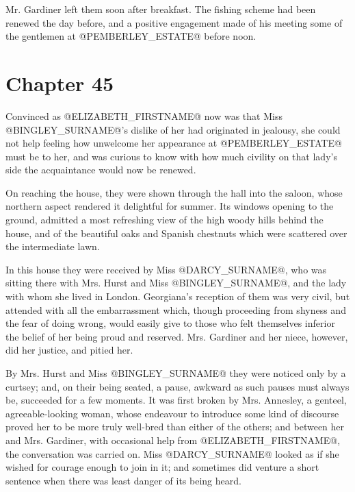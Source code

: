 Mr. Gardiner left them soon after breakfast. The fishing scheme had been
renewed the day before, and a positive engagement made of his meeting
some of the gentlemen at @PEMBERLEY_ESTATE@ before noon.



\chapter*{Chapter 45}


Convinced as @ELIZABETH_FIRSTNAME@ now was that Miss @BINGLEY_SURNAME@'s dislike of her had
originated in jealousy, she could not help feeling how unwelcome her
appearance at @PEMBERLEY_ESTATE@ must be to her, and was curious to know with how
much civility on that lady's side the acquaintance would now be renewed.

On reaching the house, they were shown through the hall into the saloon,
whose northern aspect rendered it delightful for summer. Its windows
opening to the ground, admitted a most refreshing view of the high woody
hills behind the house, and of the beautiful oaks and Spanish chestnuts
which were scattered over the intermediate lawn.

In this house they were received by Miss @DARCY_SURNAME@, who was sitting there
with Mrs. Hurst and Miss @BINGLEY_SURNAME@, and the lady with whom she lived in
London. Georgiana's reception of them was very civil, but attended with
all the embarrassment which, though proceeding from shyness and the fear
of doing wrong, would easily give to those who felt themselves inferior
the belief of her being proud and reserved. Mrs. Gardiner and her niece,
however, did her justice, and pitied her.

By Mrs. Hurst and Miss @BINGLEY_SURNAME@ they were noticed only by a curtsey; and,
on their being seated, a pause, awkward as such pauses must always be,
succeeded for a few moments. It was first broken by Mrs. Annesley, a
genteel, agreeable-looking woman, whose endeavour to introduce some kind
of discourse proved her to be more truly well-bred than either of the
others; and between her and Mrs. Gardiner, with occasional help from
@ELIZABETH_FIRSTNAME@, the conversation was carried on. Miss @DARCY_SURNAME@ looked as if she
wished for courage enough to join in it; and sometimes did venture a
short sentence when there was least danger of its being heard.

